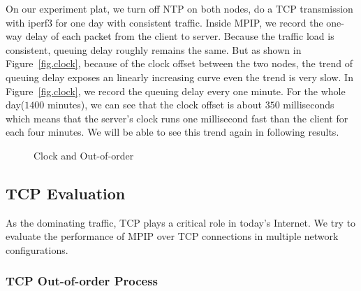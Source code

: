 On our experiment plat, we turn off NTP on both nodes, do a TCP transmission with iperf3 for one day with consistent traffic. Inside MPIP, we record the one-way delay of each packet from the client to server. Because the traffic load is consistent, queuing delay roughly remains the same. But as shown in Figure~\ref{fig.clock}, because of the clock offset between the two nodes, the trend of queuing delay exposes an linearly increasing curve even the trend is very slow. In Figure~\ref{fig.clock}, we record the queuing delay every one minute. For the whole day($1400$ minutes), we can see that the clock offset is about $350$ milliseconds which means that the server's clock runs one millisecond fast than the client for each four minutes. We will be able to see this trend again in following results.

\begin{figure}
\caption{Clock and Out-of-order}
\label{fig.clockandoutoforder}
\end{figure}


\subsection{TCP Evaluation}
\label{sec:tcp}

As the dominating traffic, TCP plays a critical role in today's Internet. We try to evaluate the performance of MPIP over TCP connections in multiple network configurations. 

\subsubsection{TCP Out-of-order Process}
\label{sec:outoforder}

